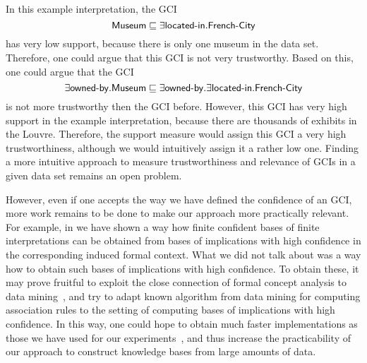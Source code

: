 In this example interpretation, the GCI
\begin{equation*}
  \mathsf{Museum} \sqsubseteq \exists \text{\textsf{located-in}}. \text{\textsf{French-City}}
\end{equation*}
has very low support, because there is only one museum in the data set.  Therefore, one
could argue that this GCI is not very trustworthy.  Based on this, one could argue that
the GCI
\begin{equation*}
  \exists \text{\textsf{owned-by}}. \mathsf{Museum} \sqsubseteq \exists
  \text{\textsf{owned-by}}. \exists \text{\textsf{located-in}}. \text{\textsf{French-City}}
\end{equation*}
is not more trustworthy then the GCI before.  However, this GCI has very high support in
the example interpretation, because there are thousands of exhibits in the Louvre.
Therefore, the support measure would assign this GCI a very high trustworthiness, although
we would intuitively assign it a rather low one.  Finding a more intuitive approach to
measure trustworthiness and relevance of GCIs in a given data set remains an open problem.

However, even if one accepts the way we have defined the confidence of an GCI, more work
remains to be done to make our approach more practically relevant.  For example, in
 we have shown a
way how finite confident bases of finite interpretations can be obtained from bases of
implications with high confidence in the corresponding induced formal context.  What we
did not talk about was a way how to obtain such bases of implications with high
confidence.  To obtain these, it may prove fruitful to exploit the close connection of
formal concept analysis to data mining~\cite{arules:Zaki:1998}, and try to adapt known
algorithm from data mining for computing association rules to the setting of computing
bases of implications with high confidence.  In this way, one could hope to obtain much
faster implementations as those we have used for our
experiments~\cite{DBLP:conf/icdm/BorchmannD11}, and thus increase the practicability of
our approach to construct knowledge bases from large amounts of data.

